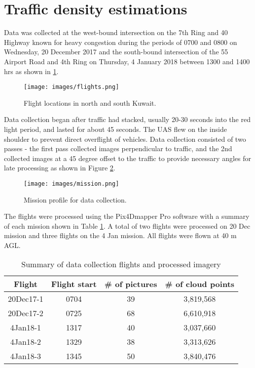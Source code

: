 \section{Traffic density estimations}

Data was collected at the west-bound intersection on the 7th Ring and 40 Highway known for heavy congestion during the periods of 0700 and 0800 on Wednesday, 20 December 2017 and the south-bound intersection of the 55 Airport Road and 4th Ring on Thursday, 4 January 2018 between 1300 and 1400 hrs as shown in \ref{fig:flights}. 

\begin{figure}[H]
\texttt{[image: images/flights.png]} 
\caption[Flight locations]{Flight locations in north and south Kuwait.}
\label{fig:flights}
\end{figure}

Data collection began after traffic had stacked, usually 20-30 seconds into the red light period, and lasted for about 45 seconds. The UAS flew on the inside shoulder to prevent direct overflight of vehicles. Data collection consisted of two passes - the first pass collected images perpendicular to traffic, and the 2nd collected images at a 45 degree offset to the traffic to provide necessary angles for late processing as shown in Figure \ref{fig:mission}.

\begin{figure}[H]
\texttt{[image: images/mission.png]} 
\caption{Mission profile for data collection.}
\label{fig:mission}
\end{figure}

The flights were processed using the Pix4Dmapper Pro software with a summary of  each mission shown in Table \ref{tb:flightdata}. A total of two flights were processed on 20 Dec mission and three flights on the 4 Jan mission. All flights were flown at 40 m AGL.

\begin{table}[H]
\centering
\caption{Summary of data collection flights and processed imagery}
\label{tb:flightdata}
\begin{tabular}{@{}cccc@{}}
\toprule
\textbf{Flight} & \textbf{Flight start} & \textbf{\# of pictures} & \textbf{\# of cloud points} \\ \midrule
20Dec17-1 & 0704 & 39 & 3,819,568 \\
20Dec17-2 & 0725 & 68 & 6,610,918 \\
4Jan18-1 & 1317 & 40 & 3,037,660 \\
4Jan18-2 & 1329 & 38 & 3,313,626 \\
4Jan18-3 & 1345 & 50 & 3,840,476 \\ \bottomrule
\end{tabular}
\end{table}


